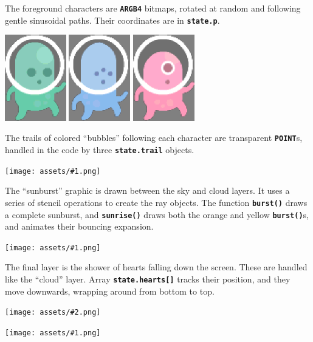 \documentclass[10pt]{book}
\newcommand{\png}[1]{
\begin{center}
\texttt{[image: assets/\#1.png]}
\end{center}
}
\newcommand{\szpng}[2]{
\begin{center}
\texttt{[image: assets/\#2.png]}
\end{center}
}
\newcommand{\mach}[1]{\texttt{\textbf{#1}}}
\begin{document}
\newpage
The foreground characters are \mach{ARGB4} bitmaps, rotated at random
and following gentle sinusoidal paths.
Their coordinates are in \mach{state.p}.
\begin{center}
\includegraphics[width=0.2\textwidth]{previews/kenney-PLAYER1-00.png}
\includegraphics[width=0.2\textwidth]{previews/kenney-PLAYER1-01.png}
\includegraphics[width=0.2\textwidth]{previews/kenney-PLAYER1-02.png}
\end{center}
The trails of colored ``bubbles'' following each character are transparent
\mach{POINT}s, handled in the code by three \mach{state.trail} objects.
\png{kenney_3}

The ``sunburst'' graphic is drawn between the sky and cloud layers.
It uses a series of stencil operations to create the ray objects.
The function \mach{burst()} draws a complete sunburst, and
\mach{sunrise()} draws both the orange and yellow \mach{burst()}s, and animates their bouncing expansion.

\png{kenney_4}

The final layer is the shower of hearts falling down the screen.
These are handled like the ``cloud'' layer.
Array \mach{state.hearts[]} tracks their position, and they move downwards, wrapping around from bottom to top.
\szpng{0.2}{previews/kenney-HEART-00}

\png{kenney_5}
\end{document}
